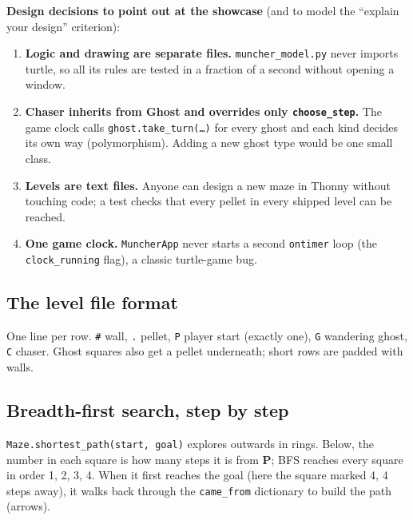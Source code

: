 \documentclass[level=3,teacher]{kidscode}
\begin{document}
\textbf{Design decisions to point out at the showcase} (and to model the \enquote{explain your
design} criterion):
\begin{enumerate}[itemsep=2pt]
  \item \textbf{Logic and drawing are separate files.} \texttt{muncher\_model.py} never imports
        turtle, so all its rules are tested in a fraction of a second without opening a window.
  \item \textbf{Chaser inherits from Ghost and overrides only \texttt{choose\_step}.} The game clock
        calls \texttt{ghost.take\_turn(\ldots)} for every ghost and each kind decides its own way
        (polymorphism). Adding a new ghost type would be one small class.
  \item \textbf{Levels are text files.} Anyone can design a new maze in Thonny without touching
        code; a test checks that every pellet in every shipped level can be reached.
  \item \textbf{One game clock.} \texttt{MuncherApp} never starts a second \texttt{ontimer} loop
        (the \texttt{clock\_running} flag), a classic turtle-game bug.
\end{enumerate}

\subsection{The level file format}
One line per row. \texttt{\#} wall, \texttt{.} pellet, \texttt{P} player start (exactly one),
\texttt{G} wandering ghost, \texttt{C} chaser. Ghost squares also get a pellet underneath; short
rows are padded with walls.
\begin{tcolorbox}[kccode,left=6pt,title={\small\faFile*[regular]\ \texttt{levels/level1.txt}}]

\end{tcolorbox}

\subsection{Breadth-first search, step by step}
\texttt{Maze.shortest\_path(start, goal)} explores outwards in rings. Below, the number in each
square is how many steps it is from \textbf{P}; BFS reaches every square in order 1, 2, 3, 4.
When it first reaches the goal (here the square marked 4, 4 steps away), it walks back through
the \texttt{came\_from} dictionary to build the path (arrows).
\end{document}
